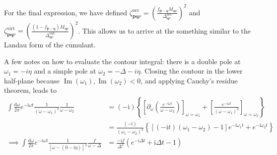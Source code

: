 For the final expression, we have defined $\zeta_{\bm{p}\bm{q}\nu}^{\text{occ}} = \left(\frac{f_{\bm{p}-\bm{q}} M_{\bm{q}\nu}}{\Delta^{\text{occ}}_{\bm{q}\nu}}\right)^2$ and $\zeta_{\bm{p}\bm{q}\nu}^{\text{virt}} = \left(\frac{(1-f_{\bm{p}-\bm{q}}) M_{\bm{q}\nu}}{\Delta^{\text{virt}}_{\bm{q}\nu}}\right)^2$. This allows us to arrive at the something similar to the Landau form of the cumulant.
\begin{tcolorbox}
A few notes on how to evaluate the contour integral: there is a double pole at $\omega_1 = -i\eta$ and a simple pole at $\omega_2 = -\Delta - i\eta$. Closing the contour in the lower half-plane because $\operatorname{Im}\left(\omega_1\right), \operatorname{Im}\left(\omega_2\right)<0$, and applying Cauchy's residue theorem, leads to
\begin{align}
    \int \frac{\mathrm{d} \omega}{2 \pi} e^{-\mathrm{i} \omega t} \frac{1}{\left(\omega-\omega_1\right)^2} \frac{1}{\omega-\omega_2} & =(-\mathrm{i})\left\{\left[\partial_\omega\left(\frac{e^{-\mathrm{i} \omega t}}{\omega-\omega_2}\right)\right]_{\omega=\omega_1}+\left[\frac{e^{-\mathrm{i} \omega t}}{\left(\omega-\omega_1\right)^2}\right]_{\omega=\omega_2}\right\} \\
    & =\frac{(-\mathrm{i})}{\left(\omega_1-\omega_2\right)^2}\left\{\left[(-\mathrm{i} t)\left(\omega_1-\omega_2\right)-1\right] e^{-\mathrm{i} \omega_1 t}+e^{-\mathrm{i} \omega_2 t}\right\}\\
\implies \int \frac{\mathrm{d} \omega}{2 \pi} e^{-i \omega t} \frac{1}{[\omega-(0-\mathrm{i} \eta)]^2} \frac{f}{\omega-\Delta}&=\frac{-\mathrm{i}f}{\Delta^2}\left(e^{-\mathrm{i} \Delta t}+\mathrm{i} \Delta t-1\right)
\end{align}
\end{tcolorbox}
